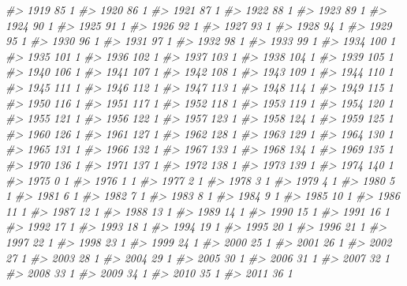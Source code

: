 \documentclass[]{article}
\newenvironment{Shaded}{\begin{snugshade}}{\end{snugshade}}
\newcommand{\CommentTok}[1]{\textcolor[rgb]{0.56,0.35,0.01}{\textit{#1}}}
\begin{document}
\begin{Shaded}
\begin{Highlighting}[]
\CommentTok{#> 1919  85  1}
\CommentTok{#> 1920  86  1}
\CommentTok{#> 1921  87  1}
\CommentTok{#> 1922  88  1}
\CommentTok{#> 1923  89  1}
\CommentTok{#> 1924  90  1}
\CommentTok{#> 1925  91  1}
\CommentTok{#> 1926  92  1}
\CommentTok{#> 1927  93  1}
\CommentTok{#> 1928  94  1}
\CommentTok{#> 1929  95  1}
\CommentTok{#> 1930  96  1}
\CommentTok{#> 1931  97  1}
\CommentTok{#> 1932  98  1}
\CommentTok{#> 1933  99  1}
\CommentTok{#> 1934 100  1}
\CommentTok{#> 1935 101  1}
\CommentTok{#> 1936 102  1}
\CommentTok{#> 1937 103  1}
\CommentTok{#> 1938 104  1}
\CommentTok{#> 1939 105  1}
\CommentTok{#> 1940 106  1}
\CommentTok{#> 1941 107  1}
\CommentTok{#> 1942 108  1}
\CommentTok{#> 1943 109  1}
\CommentTok{#> 1944 110  1}
\CommentTok{#> 1945 111  1}
\CommentTok{#> 1946 112  1}
\CommentTok{#> 1947 113  1}
\CommentTok{#> 1948 114  1}
\CommentTok{#> 1949 115  1}
\CommentTok{#> 1950 116  1}
\CommentTok{#> 1951 117  1}
\CommentTok{#> 1952 118  1}
\CommentTok{#> 1953 119  1}
\CommentTok{#> 1954 120  1}
\CommentTok{#> 1955 121  1}
\CommentTok{#> 1956 122  1}
\CommentTok{#> 1957 123  1}
\CommentTok{#> 1958 124  1}
\CommentTok{#> 1959 125  1}
\CommentTok{#> 1960 126  1}
\CommentTok{#> 1961 127  1}
\CommentTok{#> 1962 128  1}
\CommentTok{#> 1963 129  1}
\CommentTok{#> 1964 130  1}
\CommentTok{#> 1965 131  1}
\CommentTok{#> 1966 132  1}
\CommentTok{#> 1967 133  1}
\CommentTok{#> 1968 134  1}
\CommentTok{#> 1969 135  1}
\CommentTok{#> 1970 136  1}
\CommentTok{#> 1971 137  1}
\CommentTok{#> 1972 138  1}
\CommentTok{#> 1973 139  1}
\CommentTok{#> 1974 140  1}
\CommentTok{#> 1975   0  1}
\CommentTok{#> 1976   1  1}
\CommentTok{#> 1977   2  1}
\CommentTok{#> 1978   3  1}
\CommentTok{#> 1979   4  1}
\CommentTok{#> 1980   5  1}
\CommentTok{#> 1981   6  1}
\CommentTok{#> 1982   7  1}
\CommentTok{#> 1983   8  1}
\CommentTok{#> 1984   9  1}
\CommentTok{#> 1985  10  1}
\CommentTok{#> 1986  11  1}
\CommentTok{#> 1987  12  1}
\CommentTok{#> 1988  13  1}
\CommentTok{#> 1989  14  1}
\CommentTok{#> 1990  15  1}
\CommentTok{#> 1991  16  1}
\CommentTok{#> 1992  17  1}
\CommentTok{#> 1993  18  1}
\CommentTok{#> 1994  19  1}
\CommentTok{#> 1995  20  1}
\CommentTok{#> 1996  21  1}
\CommentTok{#> 1997  22  1}
\CommentTok{#> 1998  23  1}
\CommentTok{#> 1999  24  1}
\CommentTok{#> 2000  25  1}
\CommentTok{#> 2001  26  1}
\CommentTok{#> 2002  27  1}
\CommentTok{#> 2003  28  1}
\CommentTok{#> 2004  29  1}
\CommentTok{#> 2005  30  1}
\CommentTok{#> 2006  31  1}
\CommentTok{#> 2007  32  1}
\CommentTok{#> 2008  33  1}
\CommentTok{#> 2009  34  1}
\CommentTok{#> 2010  35  1}
\CommentTok{#> 2011  36  1}

\end{Highlighting}
\end{Shaded}
\end{document}
